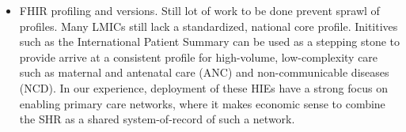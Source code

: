 \documentclass[
  authoryear]{elsarticle}
\providecommand{\tightlist}{%
  \setlength{\itemsep}{0pt}\setlength{\parskip}{0pt}}\usepackage{longtable,booktabs,array}
\begin{document}
\begin{itemize}
  \begin{itemize}
  \tightlist
  \item
    FHIR profiling and versions. Still lot of work to be done prevent
    sprawl of profiles. Many LMICs still lack a standardized, national
    core profile. Inititives such as the International Patient Summary
    can be used as a stepping stone to provide arrive at a consistent
    profile for high-volume, low-complexity care such as maternal and
    antenatal care (ANC) and non-communicable diseases (NCD). In our
    experience, deployment of these HIEs have a strong focus on enabling
    primary care networks, where it makes economic sense to combine the
    SHR as a shared system-of-record of such a network.
  \end{itemize}
\end{itemize}
\end{document}
